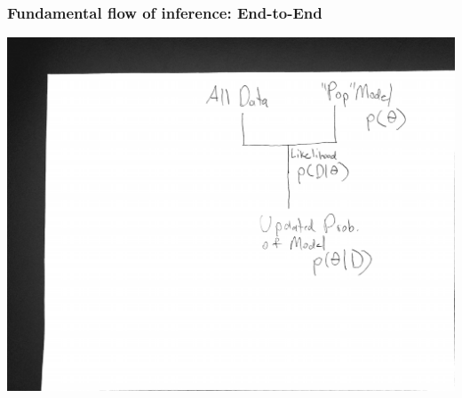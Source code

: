 \documentclass{beamer}
\begin{document}
\begin{frame}[t]
  \frametitle{Fundamental flow of inference: End-to-End}
    \includegraphics[height=.85\textheight]{e2e_flow.pdf}
\end{frame}
\end{document}
